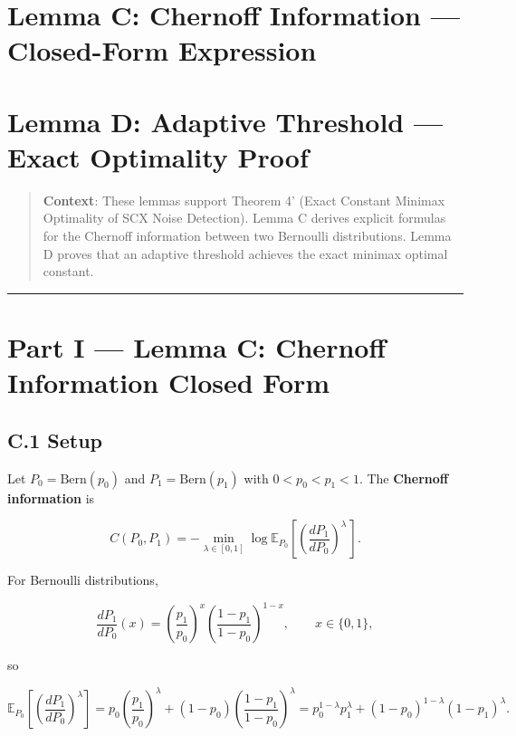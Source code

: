 \documentclass[
  12pt,
]{ctexart}
\author{SCX}
\date{2026}
\begin{document}
\section{Lemma C: Chernoff Information --- Closed-Form
Expression}\label{lemma-c-chernoff-information-closed-form-expression}

\section{Lemma D: Adaptive Threshold --- Exact Optimality
Proof}\label{lemma-d-adaptive-threshold-exact-optimality-proof}

\begin{quote}
\textbf{Context}: These lemmas support Theorem 4' (Exact Constant
Minimax Optimality of SCX Noise Detection). Lemma C derives explicit
formulas for the Chernoff information between two Bernoulli
distributions. Lemma D proves that an adaptive threshold achieves the
exact minimax optimal constant.
\end{quote}

\begin{center}\rule{0.5\linewidth}{0.5pt}\end{center}

\section{Part I --- Lemma C: Chernoff Information Closed
Form}\label{part-i-lemma-c-chernoff-information-closed-form}

\subsection{C.1 Setup}\label{c.1-setup}

Let \(P_0 = \text{Bern}(p_0)\) and \(P_1 = \text{Bern}(p_1)\) with
\(0 < p_0 < p_1 < 1\). The \textbf{Chernoff information} is

\[
C(P_0, P_1) = -\min_{\lambda \in [0,1]} \log \mathbb{E}_{P_0}\!\left[\left(\frac{dP_1}{dP_0}\right)^{\!\!\lambda}\,\right].
\]

For Bernoulli distributions,

\[
\frac{dP_1}{dP_0}(x) = \left(\frac{p_1}{p_0}\right)^x \left(\frac{1-p_1}{1-p_0}\right)^{1-x}, \qquad x \in \{0,1\},
\]

so

\[
\mathbb{E}_{P_0}\!\left[\left(\frac{dP_1}{dP_0}\right)^{\!\!\lambda}\right]
= p_0 \left(\frac{p_1}{p_0}\right)^\lambda + (1-p_0) \left(\frac{1-p_1}{1-p_0}\right)^\lambda
= p_0^{1-\lambda} p_1^\lambda + (1-p_0)^{1-\lambda} (1-p_1)^\lambda.
\]
\end{document}
